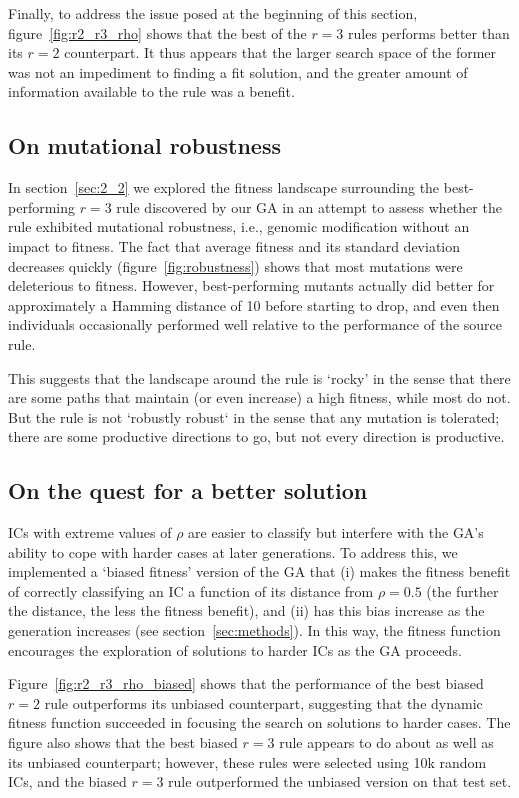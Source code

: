 Finally, to address the issue posed at the beginning of this section, figure~\ref{fig:r2_r3_rho} shows that the best of the $r = 3$ rules performs better than 
its $r = 2$ counterpart. It thus appears that the larger search space of the former was not an impediment to finding a fit solution, and the greater 
amount of information available to the rule was a benefit.

\subsection{On mutational robustness}

In section~\ref{sec:2_2} we explored the fitness landscape surrounding the best-performing $r = 3$ rule discovered by our GA in an attempt to 
assess whether the rule exhibited mutational robustness, i.e., genomic modification without an impact to fitness. The fact that average fitness 
and its standard deviation decreases quickly (figure~\ref{fig:robustness}) shows that most mutations were deleterious to fitness. However, best-performing mutants actually did better for approximately a Hamming distance of 10 before starting to drop, and even then individuals occasionally performed 
well relative to the performance of the source rule.

This suggests that the landscape around the rule is `rocky' in the sense that there are some paths that maintain (or even increase) a high 
fitness, while most do not. But the rule is not `robustly robust` in the sense that any mutation is tolerated; there are some productive directions to go, but 
not every direction is productive.

\subsection{On the quest for a better solution}

ICs with extreme values of $\rho$ are easier to classify but interfere with the GA's ability to cope with harder cases at later generations. To address this, 
we implemented a `biased fitness' version of the GA that (i) makes the fitness benefit of correctly classifying an IC a function of its distance from 
$\rho = 0.5$ (the further the distance, the less the fitness benefit), and (ii) has this bias increase as the generation increases 
(see section~\ref{sec:methods}). In this way, the fitness function encourages the exploration of solutions to harder ICs as the GA proceeds.

Figure~\ref{fig:r2_r3_rho_biased} shows that the performance of the best biased $r = 2$ rule outperforms its unbiased counterpart, suggesting that 
the dynamic fitness function succeeded in focusing the search on solutions to harder cases. The figure also shows that the best biased $r = 3$ rule 
appears to do about as well as its unbiased counterpart; however, these rules were selected using 10k random ICs, and the biased $r = 3$ rule 
outperformed the unbiased version on that test set.


